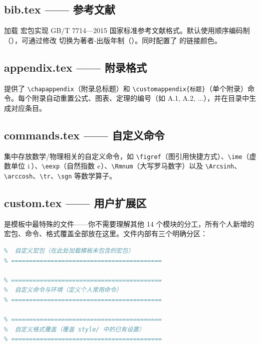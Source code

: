 \documentclass[../main-manual.tex]{subfiles}
\begin{document}
\subsection{bib.tex —— 参考文献}

加载  宏包实现 GB/T 7714—2015 国家标准参考文献格式。默认使用顺序编码制（），可通过修改 \verb|| 切换为著者-出版年制（）。同时配置了  的链接颜色。

\subsection{appendix.tex —— 附录格式}

提供了 \verb|\chapappendix|（附录总标题）和 \verb|\customappendix{标题}|（单个附录）命令。每个附录自动重置公式、图表、定理的编号（如 A.1, A.2, ...），并在目录中生成对应条目。

\subsection{commands.tex —— 自定义命令}

集中存放数学/物理相关的自定义命令，如 \verb|\figref|（图引用快捷方式）、\verb|\ime|（虚数单位 $\mathrm{i}\,$）、\verb|\eexp|（自然指数 $\mathrm{e}$）、\verb|\Rmnum|（大写罗马数字）以及 \verb|\Arcsinh|、\verb|\arccosh|、\verb|\tr|、\verb|\sgn| 等数学算子。

\subsection{custom.tex —— 用户扩展区}

 是模板中最特殊的文件——你不需要理解其他 14 个模块的分工，所有个人新增的宏包、命令、格式覆盖全部放在这里。文件内部有三个明确分区：

\begin{lstlisting}[language=TeX, caption={custom.tex 的三个分区}]
% ==========================================
%  自定义宏包（在此处加载模板未包含的宏包）
% ==========================================

% ==========================================
%  自定义命令与环境（定义个人常用命令）
% ==========================================

% ==========================================
%  自定义格式覆盖（覆盖 style/ 中的已有设置）
% ==========================================
\end{lstlisting}
\end{document}
